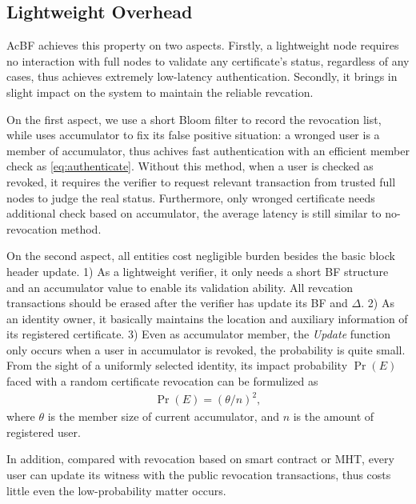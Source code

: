 \documentclass[conference]{IEEEtran}
\begin{document}
\subsection{Lightweight Overhead}
AcBF achieves this property on two aspects. Firstly, a lightweight node requires no interaction with full nodes to validate any certificate's status, regardless of any cases, thus achieves extremely low-latency authentication. Secondly, it brings in slight impact on the system to maintain the reliable revcation.

On the first aspect, we use a short Bloom filter to record the revocation list, while uses accumulator to fix its false positive situation: a wronged user is a member of accumulator, thus achives fast authentication with an efficient member check as \eqref{eq:authenticate}. Without this method, when a user is checked as revoked, it requires the verifier to request relevant transaction from trusted full nodes to judge the real status. Furthermore, only wronged certificate needs additional check based on accumulator, the average latency is still similar to no-revocation method. 

On the second aspect, all entities cost negligible burden besides the basic block header update. 1) As a lightweight verifier, it only needs a short BF structure and an accumulator value to enable its validation ability. All revcation transactions should be erased after the verifier has update its BF and $\Delta$. 2) As an identity owner, it basically maintains the location and auxiliary information of its registered certificate. 3) Even as accumulator member, the \textit{Update} function only occurs when a user in accumulator is revoked, the probability is quite small. From the sight of a uniformly selected identity, its impact probability $\Pr(E)$ faced with a random certificate revocation can be formulized as 
\begin{align}
	\Pr(E) = (\theta / n)^2 ,
\end{align}
where $\theta$ is the member size of current accumulator, and $n$ is the amount of registered user.

In addition, compared with revocation based on smart contract or MHT, every user can update its witness with the public revocation transactions, thus costs little even the low-probability matter occurs.
\end{document}
